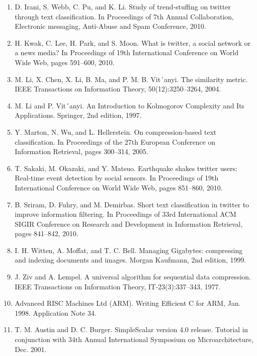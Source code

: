 \documentclass{article}
\begin{document}
\begin{enumerate}
	\item D. Irani, S. Webb, C. Pu, and K. Li. Study of
	trend-stuffing on twitter through text classification. In
	Proceedings of 7th Annual Collaboration, Electronic
	messaging, Anti-Abuse and Spam Conference, 2010.

	\item H. Kwak, C. Lee, H. Park, and S. Moon. What is
	twitter, a social network or a news media? In
	Proceedings of 19th International Conference on
	World Wide Web, pages 591–600, 2010.

	\item M. Li, X. Chen, X. Li, B. Ma, and P. M. B. Vit´anyi.
	The similarity metric. IEEE Transactions on
	Information Theory, 50(12):3250–3264, 2004.

	\item M. Li and P. Vit´anyi. An Introduction to Kolmogorov
	Complexity and Its Applications. Springer, 2nd
	edition, 1997.

	\item Y. Marton, N. Wu, and L. Hellerstein. On
	compression-based text classification. In Proceedings of
	the 27th European Conference on Information
	Retrieval, pages 300–314, 2005.
	
	\item T. Sakaki, M. Okazaki, and Y. Matsuo. Earthquake
	shakes twitter users: Real-time event detection by
	social sensors. In Proceedings of 19th International
	Conference on World Wide Web, pages 851–860, 2010.
	
	\item B. Sriram, D. Fuhry, and M. Demirbas. Short text
	classification in twitter to improve information
	filtering. In Proceedings of 33rd International ACM
	SIGIR Conference on Research and Development in
	Information Retrieval, pages 841–842, 2010.
	
	\item I. H. Witten, A. Moffat, and T. C. Bell. Managing
	Gigabytes: compressing and indexing documents and
	images. Morgan Kaufmann, 2nd edition, 1999.

	\item J. Ziv and A. Lempel. A universal algorithm for
	sequential data compression. IEEE Transactions on
	Information Theory, IT-23(3):337–343, 1977.
	
	\item Advanced RISC Machines Ltd (ARM). Writing Efficient
	C for ARM, Jan. 1998. Application Note 34.
	
	\item T. M. Austin and D. C. Burger. SimpleScalar version 4.0
	release. Tutorial in conjunction with 34th Annual International Symposium on Microarchitecture, Dec. 2001.
	

\end{enumerate}
\end{document}
